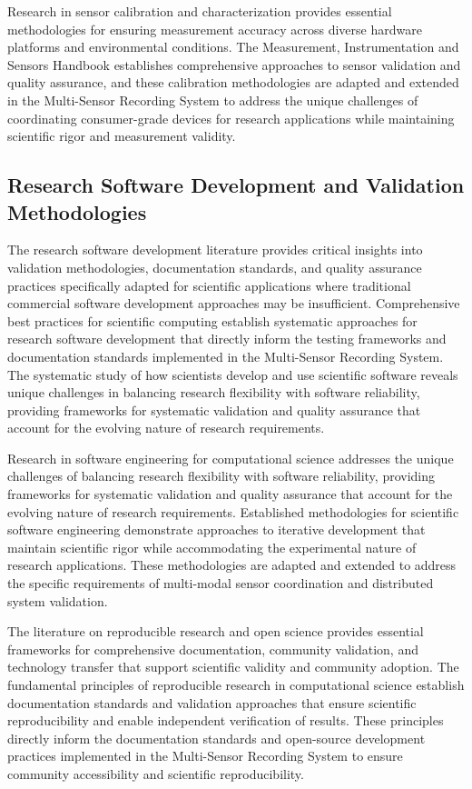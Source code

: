 \documentclass[11pt,a4paper]{report}
\begin{document}
Research in sensor calibration and characterization provides essential methodologies for ensuring measurement accuracy across diverse hardware platforms and environmental conditions. The Measurement, Instrumentation and Sensors Handbook establishes comprehensive approaches to sensor validation and quality assurance, and these calibration methodologies are adapted and extended in the Multi-Sensor Recording System to address the unique challenges of coordinating consumer-grade devices for research applications while maintaining scientific rigor and measurement validity.

\subsection{Research Software Development and Validation Methodologies}

The research software development literature provides critical insights into validation methodologies, documentation standards, and quality assurance practices specifically adapted for scientific applications where traditional commercial software development approaches may be insufficient. Comprehensive best practices for scientific computing establish systematic approaches for research software development that directly inform the testing frameworks and documentation standards implemented in the Multi-Sensor Recording System. The systematic study of how scientists develop and use scientific software reveals unique challenges in balancing research flexibility with software reliability, providing frameworks for systematic validation and quality assurance that account for the evolving nature of research requirements.

Research in software engineering for computational science addresses the unique challenges of balancing research flexibility with software reliability, providing frameworks for systematic validation and quality assurance that account for the evolving nature of research requirements. Established methodologies for scientific software engineering demonstrate approaches to iterative development that maintain scientific rigor while accommodating the experimental nature of research applications. These methodologies are adapted and extended to address the specific requirements of multi-modal sensor coordination and distributed system validation.

The literature on reproducible research and open science provides essential frameworks for comprehensive documentation, community validation, and technology transfer that support scientific validity and community adoption. The fundamental principles of reproducible research in computational science establish documentation standards and validation approaches that ensure scientific reproducibility and enable independent verification of results. These principles directly inform the documentation standards and open-source development practices implemented in the Multi-Sensor Recording System to ensure community accessibility and scientific reproducibility.
\end{document}

